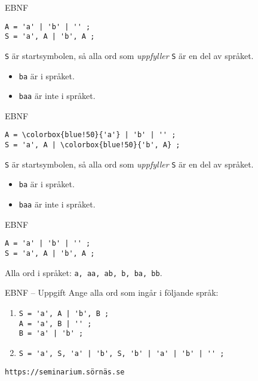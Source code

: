 \documentclass{beamer}
\begin{document}
  \begin{frame}[fragile]{EBNF}
    \begin{Verbatim}[commandchars=\\\{\}]
A = 'a' | 'b' | '' ;
S = 'a', A | 'b', A ;
    \end{Verbatim}

    \texttt{S} är startsymbolen, så alla ord som \emph{uppfyller} \texttt{S} är
    en del av språket.

    \begin{itemize}
      \item \texttt{ba} är i språket.
      \item \texttt{baa} är inte i språket.
    \end{itemize}

  \end{frame}

  \begin{frame}[fragile]{EBNF}
    \begin{Verbatim}[commandchars=\\\{\}]
A = \colorbox{blue!50}{'a'} | 'b' | '' ;
S = 'a', A | \colorbox{blue!50}{'b', A} ;
    \end{Verbatim}

    \texttt{S} är startsymbolen, så alla ord som \emph{uppfyller} \texttt{S} är
    en del av språket.

    \begin{itemize}
      \item \texttt{ba} är i språket.
      \item \texttt{baa} är inte i språket.
    \end{itemize}

  \end{frame}

  \begin{frame}[fragile]{EBNF}
    \begin{Verbatim}[commandchars=\\\{\}]
A = 'a' | 'b' | '' ;
S = 'a', A | 'b', A ;
    \end{Verbatim}

    Alla ord i språket: \texttt{a, aa, ab, b, ba, bb}.
  \end{frame}

  \begin{frame}[fragile]{EBNF -- Uppgift}
    Ange alla ord som ingår i följande språk:

    \begin{enumerate}
      \item \begin{Verbatim}
S = 'a', A | 'b', B ;
A = 'a', B | '' ;
B = 'a' | 'b' ;
      \end{Verbatim}
      \item \begin{Verbatim}
S = 'a', S, 'a' | 'b', S, 'b' | 'a' | 'b' | '' ;
      \end{Verbatim}
    \end{enumerate}

    \texttt{https://seminarium.sörnäs.se}

  \end{frame}
\end{document}

